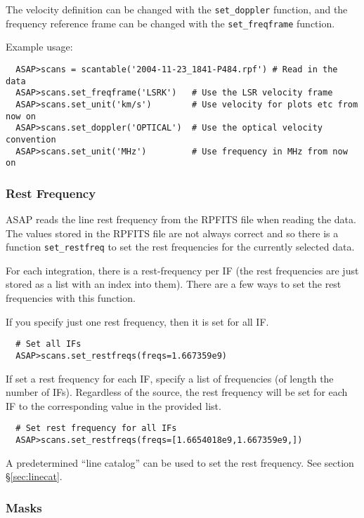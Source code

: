 \documentclass[11pt]{article}
\newcommand{\cmd}[1]{{\tt #1}}
\begin{document}
The velocity definition can be changed with the \cmd{set\_doppler}
function, and the frequency reference frame can be changed with the
\cmd{set\_freqframe} function.

Example usage:

\begin{verbatim}
  ASAP>scans = scantable('2004-11-23_1841-P484.rpf') # Read in the data
  ASAP>scans.set_freqframe('LSRK')   # Use the LSR velocity frame
  ASAP>scans.set_unit('km/s')        # Use velocity for plots etc from now on
  ASAP>scans.set_doppler('OPTICAL')  # Use the optical velocity convention
  ASAP>scans.set_unit('MHz')         # Use frequency in MHz from now on
\end{verbatim}


\subsubsection{Rest Frequency}

ASAP reads the line rest frequency
from the RPFITS file when reading the data. The values stored in the
RPFITS file are not always correct and so there is a function
\cmd{set\_restfreq} to set the rest frequencies for the currently
selected data.

For each integration, there is a rest-frequency per IF (the rest
frequencies are just stored as a list with an index into them).
There are a few ways to set the rest frequencies with this function.

If you specify just one rest frequency, then it is set for all IF.

\begin{verbatim}
  # Set all IFs
  ASAP>scans.set_restfreqs(freqs=1.667359e9)
\end{verbatim}

If set a rest frequency for each IF, specify a list of frequencies (of
length the number of IFs).  Regardless of the source, the rest
frequency will be set for each IF to the corresponding value in the
provided list.

\begin{verbatim}
  # Set rest frequency for all IFs
  ASAP>scans.set_restfreqs(freqs=[1.6654018e9,1.667359e9,])

\end{verbatim}

A predetermined ``line catalog'' can be used to set the rest
frequency. See section \S \ref{sec:linecat}.


\subsubsection{Masks}
\end{document}
